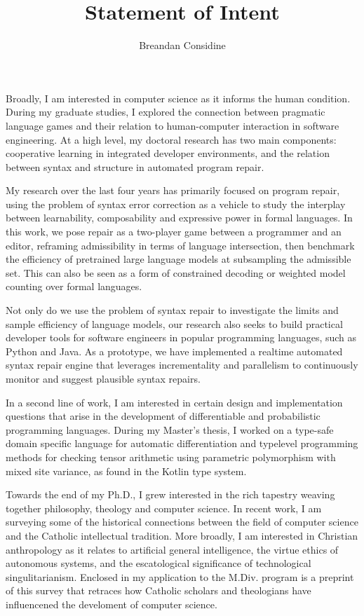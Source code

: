 \documentclass[11pt]{article}
\title{Statement of Intent}
\author{Breandan Considine}
\begin{document}
\maketitle
Broadly, I am interested in computer science as it informs the human condition. During my graduate studies, I explored the connection between pragmatic language games and their relation to human-computer interaction in software engineering. At a high level, my doctoral research has two main components: cooperative learning in integrated developer environments, and the relation between syntax and structure in automated program repair.

My research over the last four years has primarily focused on program repair, using the problem of syntax error correction as a vehicle to study the interplay between learnability, composability and expressive power in formal languages. In this work, we pose repair as a two-player game between a programmer and an editor, reframing admissibility in terms of language intersection, then benchmark the efficiency of pretrained large language models at subsampling the admissible set. This can also be seen as a form of constrained decoding or weighted model counting over formal languages.

Not only do we use the problem of syntax repair to investigate the limits and sample efficiency of language models, our research also seeks to build practical developer tools for software engineers in popular programming languages, such as Python and Java. As a prototype, we have implemented a realtime automated syntax repair engine that leverages incrementality and parallelism to continuously monitor and suggest plausible syntax repairs.

In a second line of work, I am interested in certain design and implementation questions that arise in the development of differentiable and probabilistic programming languages. During my Master's thesis, I worked on a type-safe domain specific language for automatic differentiation and typelevel programming methods for checking tensor arithmetic using parametric polymorphism with mixed site variance, as found in the Kotlin type system.

Towards the end of my Ph.D., I grew interested in the rich tapestry weaving together philosophy, theology and computer science. In recent work, I am surveying some of the historical connections between the field of computer science and the Catholic intellectual tradition. More broadly, I am interested in Christian anthropology as it relates to artificial general intelligence, the virtue ethics of autonomous systems, and the escatological significance of technological singulitarianism. Enclosed in my application to the M.Div. program is a preprint of this survey that retraces how Catholic scholars and theologians have influencened the develoment of computer science.
\end{document}
